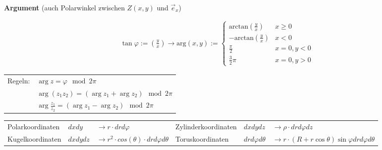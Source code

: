 \documentclass[a4paper]{article}
\begin{document}
	\textbf{Argument} (auch Polarwinkel zwischen $Z(x,y)$ und $\vec{e}_x$)
		\vspace{-8mm}
		\begin{multicols}{2}
				\vspace{-10mm}
				\begin{align*}\tan \varphi := (\frac{y}{x}) \rightarrow \text{arg}(x,y) := \begin{cases}
						\text{arctan}(\frac{y}{x})         & x \geq 0\\
						-\text{arctan}(\frac{y}{x})   & x < 0\\
						\frac{\pi}{2}                      & x = 0, y < 0\\
						\frac{3}{2}\pi                     & x = 0, y > 0
					\end{cases}
				\end{align*}
				\newline
				\newline
				\begin{tabular}{r l}
					Regeln:	&	$ \arg{z} = \varphi \mod{2\pi}$ \\
  								&	$\arg{(z_1 z_2)} = (\arg{z_1} + \arg{z_2}) \mod{2\pi}$ \\
  								&	$\arg{\frac{z_1}{z_2}} = (\arg{z_1} - \arg{z_2}) \mod{2\pi} $			
				\end{tabular}
		\end{multicols}
        \vspace{-4mm}
   
    \begin{fmerke}[Integralsubstitutionen bei Koordinatenwechsel $=|det(df)|$]
		\renewcommand{\arraystretch}{1.2}
		
        \begin{tabular}{l l l|l l l}
            Polarkoordinaten    &   $dxdy$      &   $\longrightarrow r \cdot drd\varphi$ &
            Zylinderkoordinaten &   $dxdydz$    &   $\longrightarrow \rho \cdot drd\varphi dz$\\
            Kugelkoordinaten    &   $dxdydz$    &   $\longrightarrow r^2 \cdot cos(\theta) \cdot dr d \varphi d \theta$  &
           Toruskoordinaten &	$drd\varphi d\theta$	&	$\longrightarrow r\cdot(R+r \cos \theta )\sin \varphi dr d\varphi d\theta$
        \end{tabular}
    \end{fmerke}
        \vspace{-6.2mm}
        
\end{document}
